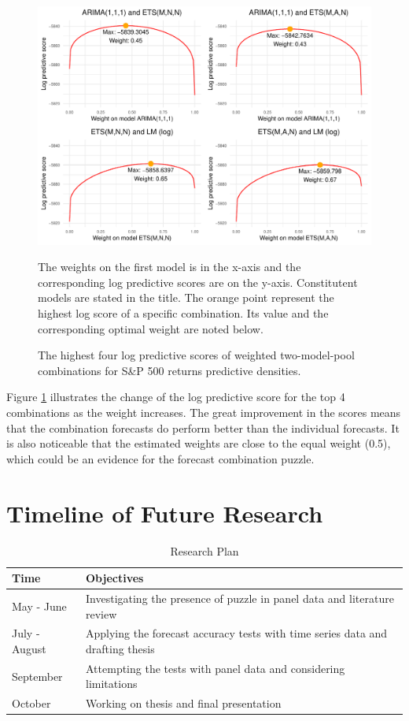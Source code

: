 \documentclass{monashthesis}
\begin{document}
\begin{figure}[ht]
\centering
\caption{The highest four log predictive scores of weighted two-model-pool combinations for S\&P 500 returns predictive densities. }
\includegraphics{figures/best4comb.pdf}
\begin{flushleft}
{\footnotesize The weights on the first model is in the x-axis and the corresponding log predictive scores are on the y-axis. Constitutent models are stated in the title. The orange point represent the highest log score of a specific combination. Its value and the corresponding optimal weight are noted below.}\\
\end{flushleft}
\label{fig:best4}
\end{figure}

Figure \ref{fig:best4} illustrates the change of the log predictive score for the top 4 combinations as the weight increases. The great improvement in the scores means that the combination forecasts do perform better than the individual forecasts. It is also noticeable that the estimated weights are close to the equal weight (0.5), which could be an evidence for the forecast combination puzzle.

\hypertarget{timeline-of-future-research}{%
\section{Timeline of Future Research}\label{timeline-of-future-research}}

\begin{table}[htbp]
  \centering
  \caption{Research Plan}
    \begin{tabular}{ll}
    Time  & Objectives \\
    \midrule
    May - June & Investigating the presence of puzzle in panel data and literature review \\
    July - August & Applying the forecast accuracy tests with time series data and drafting thesis  \\
    September & Attempting the tests with panel data and considering limitations \\
    October & Working on thesis and final presentation \\
    \end{tabular}
\end{table}
\end{document}
